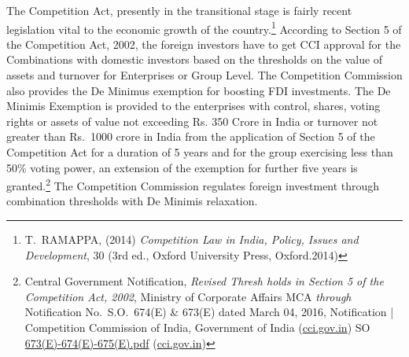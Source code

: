 \begin{multicols}{2}
\noi
The Competition Act, presently in the transitional stage is fairly recent legislation vital to the
economic growth of the country.\footnote{T.\ RAMAPPA, (2014) \textit{Competition Law in India, Policy, Issues and Development}, 30 (3rd ed., Oxford
University Press, Oxford.2014)} According to Section 5 of the Competition Act, 2002, the
foreign investors have to get CCI approval for the Combinations with domestic investors
based on the thresholds on the value of assets and turnover for Enterprises or Group Level.
The Competition Commission also provides the De Minimus exemption for boosting FDI
investments. The De Minimis Exemption is provided to the enterprises with control, shares,
voting rights or assets of value not exceeding Rs. 350 Crore in India or turnover not greater
than Rs.\ 1000 crore in India from the application of Section 5 of the Competition Act for a
duration of 5 years and for the group exercising less than 50\% voting power, an extension of
the exemption for further five years is granted.\footnote{Central Government Notification, \textit{Revised Thresh holds in Section 5 of the Competition Act, 2002}, Ministry of
Corporate Affairs MCA \textit{through} Notification No.\ S.O.\ 674(E) \& 673(E) dated March 04, 2016, Notification |
Competition Commission of India, Government of India (\url{cci.gov.in}) SO \url{673(E)-674(E)-675(E).pdf} (\url{cci.gov.in})} The Competition Commission regulates
foreign investment through combination thresholds with De Minimis relaxation.

\vspace{-.15cm}


\vspace{-.15cm}


\end{multicols}

